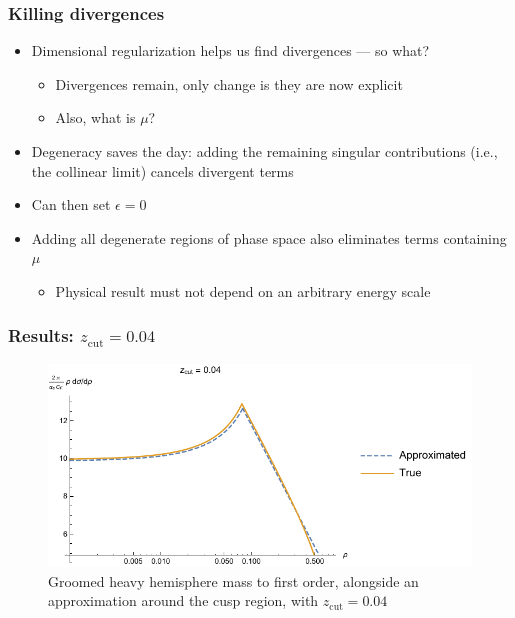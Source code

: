 \documentclass{beamer}
\newcommand{\zcut}{z_\mathrm{cut}}
\begin{document}
	\begin{frame}
		\frametitle{Killing divergences}

		\begin{itemize}
			\item Dimensional regularization helps us find divergences --- so what? 
			\begin{itemize}
				\item Divergences remain, only change is they are now explicit

				\item Also, what is $\mu$?
			\end{itemize}

			\item Degeneracy saves the day: adding the remaining singular contributions (i.e., the collinear limit) cancels divergent terms

			\item Can then set $\epsilon = 0$

			\item Adding all degenerate regions of phase space also eliminates terms containing $\mu$
			\begin{itemize}
				\item Physical result must not depend on an arbitrary energy scale
			\end{itemize}
		\end{itemize}
	\end{frame}

	\begin{frame}
		\frametitle{Results: $\zcut = 0.04$}

		\begin{figure}
			\includegraphics[width=\columnwidth]{figures/approximation.pdf}
			\caption{Groomed heavy hemisphere mass to first order, alongside an approximation around the cusp region, with $\zcut = 0.04$}
		\end{figure}
	\end{frame}
\end{document}
